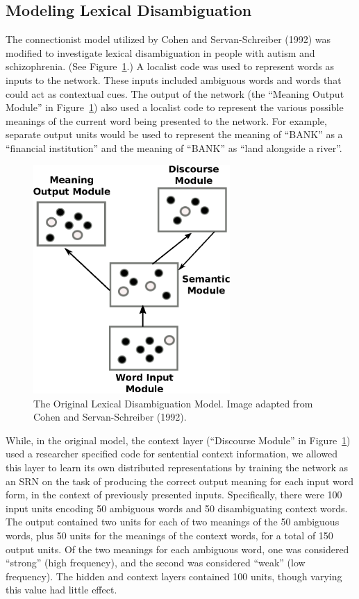 \subsection{Modeling Lexical Disambiguation}
The connectionist model utilized by Cohen and Servan-Schreiber (1992) was modified to investigate lexical disambiguation in people with autism and schizophrenia. (See Figure~\ref{cohen-servan-schreiber-model}.)  A localist code was used to represent words as inputs to the network. These inputs included ambiguous words and words that could act as contextual cues. The output of the network (the ``Meaning Output Module'' in Figure~\ref{cohen-servan-schreiber-model}) also used a localist code to represent the various possible meanings of the current word being presented to the network. For example, separate output units would be used to represent the meaning of ``BANK'' as a ``financial institution'' and the meaning of ``BANK'' as ``land alongside a river''.

\begin{figure}[tp]
\begin{center}
	\includegraphics[width=75mm]{figures/Cohen_ServanSchreiber_Model.eps}
\end{center}
\caption{The Original Lexical Disambiguation Model. Image adapted from Cohen and Servan-Schreiber (1992).}
\label{cohen-servan-schreiber-model}
\end{figure} 

While, in the original model, the context layer (``Discourse Module'' in Figure~\ref{cohen-servan-schreiber-model}) used a researcher specified code for sentential context information, we allowed this layer to learn its own distributed representations by training the network as an SRN on the task of producing the correct output meaning for each input word form, in the context of previously presented inputs. Specifically, there were 100 input units encoding 50 ambiguous words and 50 disambiguating context words. The output contained two units for each of two meanings of the 50 ambiguous words, plus 50 units for the meanings of the context words, for a total of 150 output units. Of the two meanings for each ambiguous word, one was considered ``strong'' (high frequency), and the second was considered ``weak'' (low frequency). The hidden and context layers contained 100 units, though varying this value had little effect.

